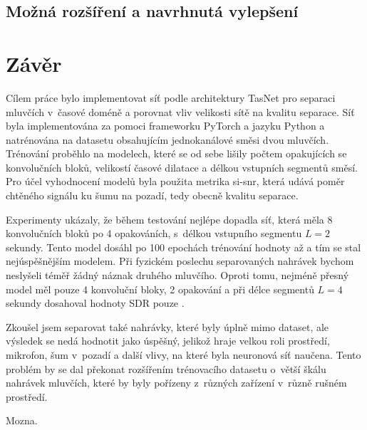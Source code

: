 

\section{Možná rozšíření a navrhnutá vylepšení}



\chapter{Závěr}
\label{zaver}

Cílem práce bylo implementovat síť podle architektury TasNet pro separaci mluvčích v~časové doméně a porovnat vliv velikosti sítě na kvalitu separace. Síť byla implementována za pomoci frameworku PyTorch a jazyku Python a natrénována na datasetu obsahujícím jednokanálové směsi dvou mluvčích. Trénování proběhlo na  modelech, které se od sebe lišily počtem opakujících se konvolučních bloků, velikostí časové dilatace a délkou vstupních segmentů směsí. Pro účel vyhodnocení modelů byla použita metrika si-snr, která udává poměr chtěného signálu ku šumu na pozadí, tedy obecně kvalitu separace. 

Experimenty ukázaly, že během testování nejlépe dopadla síť, která měla 8 konvolučních bloků po 4 opakováních, s~délkou vstupního segmentu $L=2$ sekundy. Tento model dosáhl po 100 epochách trénování hodnoty až  a tím se stal nejúspěšnějším modelem. Při fyzickém poslechu separovaných nahrávek bychom neslyšeli téměř žádný náznak druhého mluvčího. Oproti tomu, nejméně přesný model měl pouze 4 konvoluční bloky, 2 opakování a při délce segmentů $L=4$ sekundy dosahoval hodnoty SDR pouze .

Zkoušel jsem separovat také nahrávky, které byly úplně mimo dataset, ale výsledek se nedá hodnotit jako úspěšný, jelikož hraje velkou roli prostředí, mikrofon, šum v~pozadí a další vlivy, na které byla neuronová síť naučena. Tento problém by se dal překonat rozšířením trénovacího datasetu o~větší škálu nahrávek mluvčích, které by byly pořízeny z~různých zařízení v~různě rušném prostředí.

Mozna.


